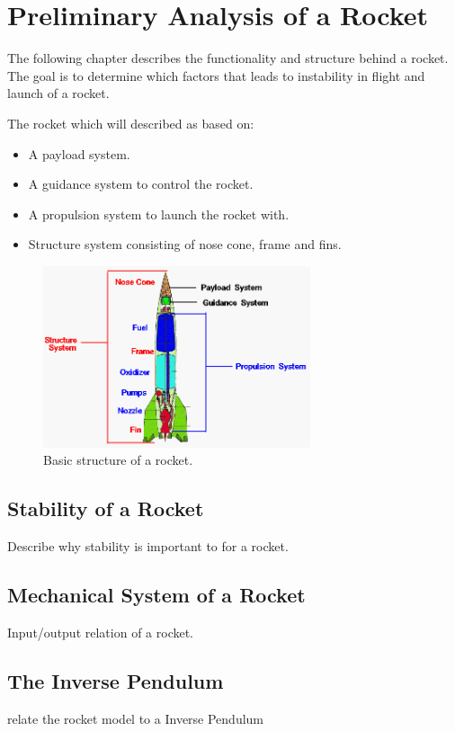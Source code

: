 \chapter{Preliminary Analysis of a Rocket}
The following chapter describes the functionality and structure behind a rocket. The goal is to determine which factors that leads to instability in flight and launch of a rocket. 
\bigbreak

The rocket which will described as based on:
\begin{itemize}[noitemsep]
\item A payload system.
\item A guidance system to control the rocket.
\item A propulsion system to launch the rocket with. 
\item Structure system consisting of nose cone, frame and fins.
\end{itemize}    

\begin{figure}[htbp]
	\centering
 	\includegraphics[width=0.7\textwidth]{figures/RocketStructure.png} 
 	\caption{Basic structure of a rocket.}
 	\label{fig:RocketStructure}
\end{figure}


\section{Stability of a Rocket}
Describe why stability is important to for a rocket. 
\section{Mechanical System of a Rocket}
Input/output relation of a rocket.
\section{The Inverse Pendulum}
relate the rocket model to a Inverse Pendulum